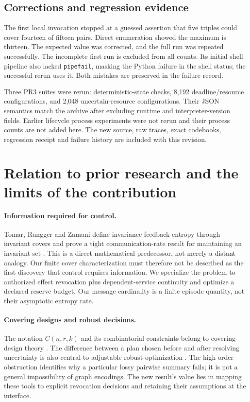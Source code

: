 \documentclass[11pt,a4paper]{article}
\theoremstyle{definition}\newtheorem{definition}{Definition}
\begin{document}
\subsection{Corrections and regression evidence}
The first local invocation stopped at a guessed assertion that five triples could cover fourteen of fifteen pairs. Direct enumeration showed the maximum is thirteen. The expected value was corrected, and the full run was repeated successfully. The incomplete first run is excluded from all counts. Its initial shell pipeline also lacked \texttt{pipefail}, masking the Python failure in the shell status; the successful rerun uses it. Both mistakes are preserved in the failure record.

Three PR3 suites were rerun: deterministic-state checks, 8,192 deadline/resource configurations, and 2,048 uncertain-resource configurations. Their JSON semantics match the archive after excluding runtime and interpreter-version fields. Earlier lifecycle process experiments were not rerun and their process counts are not added here. The new source, raw traces, exact codebooks, regression receipt and failure history are included with this revision.

\section{Relation to prior research and the limits of the contribution}
\label{sec:prior}
\paragraph{Information required for control.}
Tomar, Rungger and Zamani define invariance feedback entropy through invariant covers and prove a tight communication-rate result for maintaining an invariant set \cite{tomar}. This is a direct mathematical predecessor, not merely a distant analogy. Our finite cover characterization must therefore not be described as the first discovery that control requires information. We specialize the problem to authorized effect revocation plus dependent-service continuity and optimize a declared reserve budget. Our message cardinality is a finite episode quantity, not their asymptotic entropy rate.

\paragraph{Covering designs and robust decisions.}
The notation $C(n,r,k)$ and its combinatorial constraints belong to covering-design theory \cite{bailey}. The difference between a plan chosen before and after resolving uncertainty is also central to adjustable robust optimization \cite{bental}. The high-order obstruction identifies why a particular lossy pairwise summary fails; it is not a general impossibility of graph encodings. The new result's value lies in mapping these tools to explicit revocation decisions and retaining their assumptions at the interface.
\end{document}
